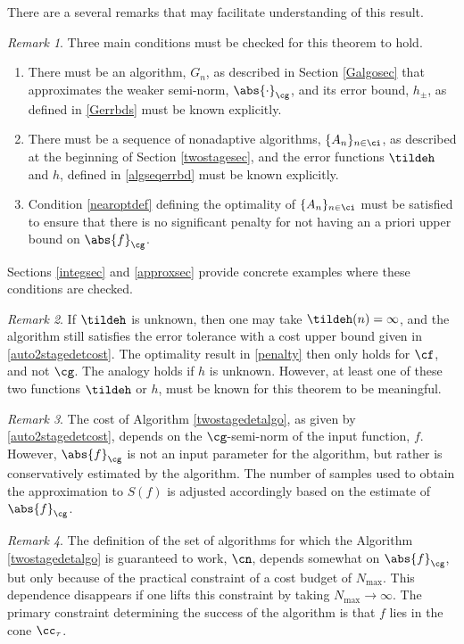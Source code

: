 \documentclass[]{elsarticle}
\theoremstyle{definition}
\theoremstyle{remark}
\newtheorem{rem}{Remark}
\newcommand{\Gnorm}[1]{\abs{#1}_{\cg}}
\begin{document}
There are a several remarks that may facilitate understanding of this result.

\begin{rem} Three main conditions must be checked for this theorem to hold.
\begin{enumerate}
\renewcommand{\labelenumi}{\roman{enumi}.}
\item There must be an algorithm, $G_n$, as described in Section \ref{Galgosec} that approximates the weaker semi-norm,  $\Gnorm{\cdot}$, and its error bound, $h_{\pm}$, as defined in \eqref{Gerrbds} must be known explicitly.
\item There must be a  sequence of nonadaptive algorithms, $\{A_n\}_{n \in \ci}$, as described at the beginning of  Section \ref{twostagesec}, and the error functions $\tildeh$ and $h$, defined in \eqref{algseqerrbd} must be known explicitly.  
\item Condition \eqref{nearoptdef} defining the optimality of $\{A_n\}_{n \in \ci}$ must be satisfied to ensure that there is no significant penalty for not having an a priori upper bound on $\Gnorm{f}$.
\end{enumerate}
Sections \ref{integsec} and \ref{approxsec} provide concrete examples where these conditions are checked.
\end{rem}

\begin{rem} If $\tildeh$ is unknown, then one may take $\tildeh(n)=\infty$, and the algorithm still satisfies the error tolerance with a cost upper bound given in \eqref{auto2stagedetcost}.  The optimality result in \eqref{penalty} then only holds for $\cf$, and not $\cg$.  The analogy holds if $h$ is unknown.  However, at least one of these two functions $\tildeh$ or $h$, must be known for this theorem to be meaningful.
\end{rem}

\begin{rem} The cost of Algorithm \ref{twostagedetalgo}, as given by \eqref{auto2stagedetcost}, depends on the $\cg$-semi-norm of the input function, $f$.  However, $\Gnorm{f}$ is not an input parameter for the algorithm, but rather is  conservatively estimated by the algorithm.  The number of samples used to obtain the approximation to $S(f)$ is adjusted accordingly based on the estimate of $\Gnorm{f}$.
\end{rem}

\begin{rem}
The definition of the set of algorithms for which the Algorithm \ref{twostagedetalgo} is guaranteed to work, $\cn$, depends somewhat on $\Gnorm{f}$, but only because of the practical constraint of a cost budget of $N_{\max}$.  This dependence disappears if one lifts this constraint by taking $N_{\max} \to \infty$.  The primary constraint determining the success of the algorithm is that $f$ lies in the cone $\cc_{\tau}$.
\end{rem}
\end{document}
